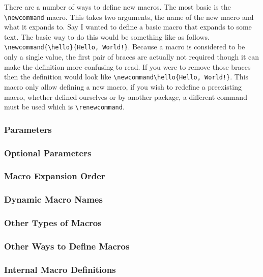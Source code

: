 There are a number of ways to define new macros. The most basic is the \verb=\newcommand= macro. This takes two arguments, the name of the new macro and what it expands to. Say I wanted to define a basic macro that expands to some text. The basic way to do this would be something like as follows. \verb=\newcommand{\hello}{Hello, World!}=. Because a macro is considered to be only a single value, the first pair of braces are actually not required though it can make the definition more confusing to read. If you were to remove those braces then the definition would look like \verb=\newcommand\hello{Hello, World!}=. This macro only allow defining a new macro, if you wish to redefine a preexisting macro, whether defined ourselves or by another package, a different command must be used which is \verb=\renewcommand=.

\subsubsection{Parameters}


\subsubsection{Optional Parameters}


\subsubsection{Macro Expansion Order}


\subsubsection{Dynamic Macro Names}


\subsubsection{Other Types of Macros}


\subsubsection{Other Ways to Define Macros} \label{section:programming/macros/otherWays}


\subsubsection{Internal Macro Definitions}

